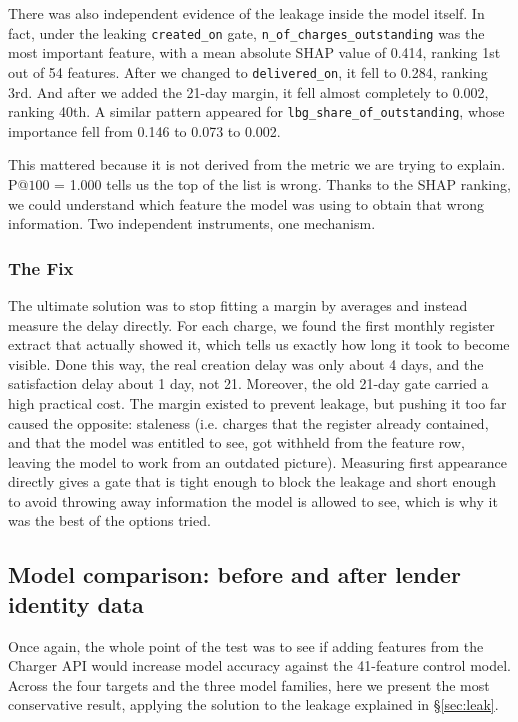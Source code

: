 \documentclass[    author={Samuel Menon Demelo; Sneha Saphala Ram Prasad; 
Viktor Ander Lindholm; Vishal Khatri},
               supervisor={Prof. Fernando Moreno-Pino},
                   degree={MSc},
                    title={Lloyds Commercial Banking Intelligence},
                 subtitle={Ranking SME Lending, Risk and Growth Prospects for Lloyds Banking Group},
                     type={},
                     year={2026}]{dissertation}
\begin{document}
 There was also independent evidence of the leakage inside the model itself. In fact, under the leaking \texttt{created\_on} gate, \texttt{n\_of\_charges\_outstanding} was the most important feature, with a mean absolute SHAP value of 0.414, ranking 1st out of 54 features. After we changed to \texttt{delivered\_on}, it fell to 0.284, ranking 3rd. And after we added the 21-day margin, it fell almost completely to 0.002, ranking 40th. A similar pattern appeared for \texttt{lbg\_share\_of\_outstanding}, whose importance fell from 0.146 to 0.073 to 0.002. 
 
This mattered because it is not derived from the metric we are trying to explain. P@$100$ = 1.000 tells
us the top of the list is wrong. Thanks to the SHAP ranking, we could understand which feature the model was using to obtain that wrong information. Two independent instruments, one mechanism.

\subsubsection{The Fix}
The ultimate solution was to stop fitting a margin by averages and instead measure the delay directly. For each charge, we found the first monthly register extract that actually showed it, which tells us exactly how long it took to become visible. Done this way, the real creation delay was only about 4 days, and the satisfaction delay about 1 day, not 21. Moreover, the old 21-day gate carried a high practical cost. The margin existed to prevent leakage, but pushing it too far caused the opposite: staleness (i.e. charges that the register already contained, and that the model was entitled to see, got withheld from the feature row, leaving the model to work from an outdated picture).
Measuring first appearance directly gives a gate that is tight enough to block the leakage and short enough to avoid throwing away information the model is allowed to see, which is why it was the best of the options tried.

\subsection{Model comparison: before and after lender identity data}
Once again, the whole point of the test was to see if adding features from the Charger API would increase model accuracy against the 41-feature control model. Across the four targets and the three model families, here we present the most conservative result, applying the solution to the leakage explained in \S\ref{sec:leak}.
\end{document}
